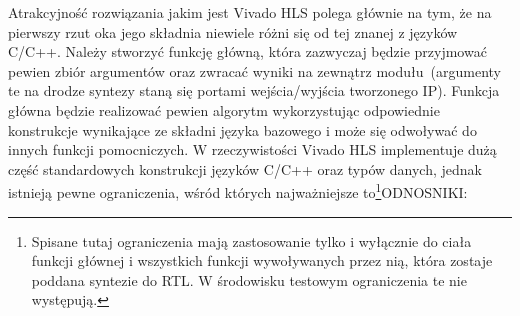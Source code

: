 Atrakcyjność rozwiązania jakim jest Vivado HLS polega głównie na tym, że na pierwszy rzut oka jego składnia niewiele różni się od tej znanej z języków C/C++. Należy stworzyć funkcję główną, która zazwyczaj będzie przyjmować pewien zbiór argumentów oraz zwracać wyniki na zewnątrz modułu~(argumenty te na drodze syntezy staną się portami wejścia/wyjścia tworzonego IP). Funkcja główna będzie realizować pewien algorytm wykorzystując odpowiednie konstrukcje wynikające ze składni języka bazowego i może się odwoływać do innych funkcji pomocniczych. W rzeczywistości Vivado HLS implementuje dużą część standardowych konstrukcji języków C/C++ oraz typów danych, jednak istnieją pewne ograniczenia, wśród których najważniejsze to\footnote{Spisane tutaj ograniczenia mają zastosowanie tylko i wyłącznie do ciała funkcji głównej i wszystkich funkcji wywoływanych przez nią, która zostaje poddana syntezie do RTL. W środowisku testowym ograniczenia te nie występują. }{\color{red}ODNOSNIKI}:
